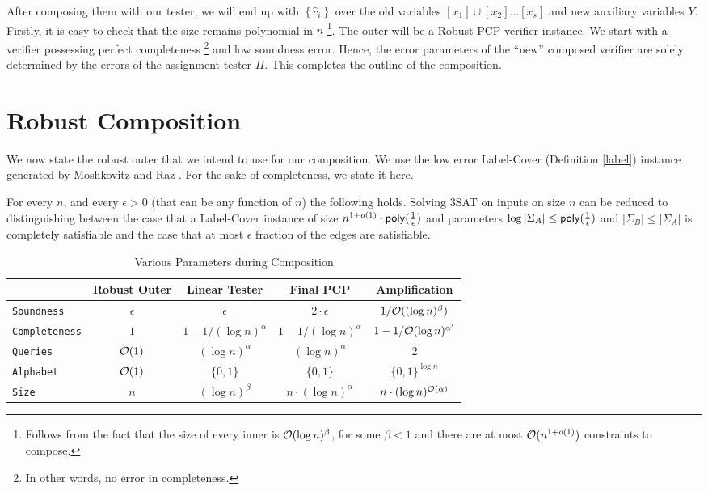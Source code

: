 \begin{itemize}
  After composing them with our tester, we will end up with
  $\left\{\widehat{c}_i\right\}$ over the old variables $[x_1] \cup
  [x_2] \ldots [x_s]$ and new auxiliary variables $Y$.  Firstly, it is
  easy to check that the size remains polynomial in $n$
  \footnote{Follows from the fact that the size of every inner is
    ${\cal O}(\log n)^\beta$, for some $\beta < 1$ and there are at
    most ${\cal O}(n^{1 + o(1)})$ constraints to compose.}. The outer
  will be a Robust PCP verifier instance. We start with a verifier
  possessing perfect completeness \footnote{In other words, no error
    in completeness.}  and low soundness error. Hence, the error
  parameters of the ``new'' composed verifier are solely determined by
  the errors of the assignment tester $\Pi$. This completes the
  outline of the composition.
\end{itemize}

\section{Robust Composition}
We now state the robust outer that we intend to use for our
composition. We use the low error {\sc Label-Cover} (Definition \ref{label}) instance generated
by Moshkovitz and Raz \cite{MR08}. For the sake of completeness, we
state it here.

\begin{theorem}\label{lowlc}
  For every $n$, and every $\epsilon > 0$ (that can be any function of
  $n$) the following holds. Solving {\sc 3SAT} on inputs on size $n$
  can be reduced to distinguishing between the case that a {\sc
    Label-Cover} instance of size $n^{1 + o(1)} \cdot {\sf
    poly}(\frac{1}{\epsilon})$ and parameters $\log
  |\Sigma_A| \le {\sf poly(\frac{1}{\epsilon})}$ and
  $|\Sigma_B| \le |\Sigma_A|$ is completely satisfiable and the case
  that at most $\epsilon$ fraction of the edges are satisfiable.
\end{theorem}

\begin{table}
\centering
\begin{tabular}{|l|c|c|c|c|}
\hline
\ &  {\sc Robust Outer} & {\sc Linear Tester} & {\sc Final PCP} & {\sc Amplification}\\
\hline
{\tt Soundness} & $\epsilon$  & $\epsilon$ &  $2 \cdot \epsilon$ & $1/{\cal O}((\log n)^\beta)$ \\
{\tt Completeness} & $1$  &  $1 - 1/(\log n)^\alpha$ & $1 - 1/(\log n)^\alpha$ & $1 - 1/{\cal O}(\log n)^{\alpha'}$ \\
{\tt Queries}  &  ${\cal O}(1)$ & $(\log n)^\alpha$ & $(\log n)^\alpha$ & $2$ \\
{\tt Alphabet} & ${\cal O}{(1)}$  & $\{0,1\}$  & $\{0,1\}$ & $\{0,1\}^{\log n}$	 \\
{\tt Size} &  $n$  & $(\log n)^\beta$ & $n \cdot (\log n)^{\alpha}$  & $n \cdot (\log n)^{{\cal O} (\alpha)}$   \\
\hline
\end{tabular} \caption{Various Parameters during Composition} \label{table:compose}
\end{table}

